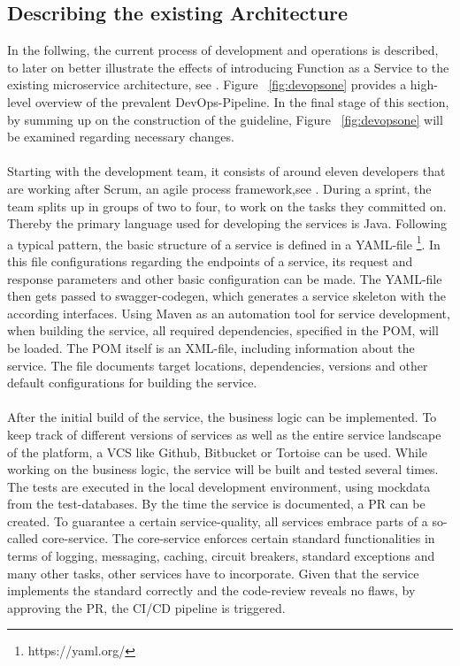\documentclass[a4paper,11pt, pagesize]{scrartcl}
\begin{document}
\begin{spacing}{1.2}
\subsection{Describing the existing Architecture}
In the follwing, the current process of development and operations is described, to later on better illustrate the effects of introducing Function as a Service to the existing microservice architecture, see \cite{newman2015building}. Figure ~\ref{fig:devopsone} provides a high-level overview of the prevalent DevOps-Pipeline. In the final stage of this section, by summing up on the construction of the guideline, Figure ~\ref{fig:devopsone} will be examined regarding necessary changes.\\\\ Starting with the development team, it consists of around eleven developers that are working after Scrum, an agile process framework,see \cite{pichler2013scrum}. During a sprint, the team splits up in groups of two to four, to work on the tasks they committed on. Thereby the primary language used for developing the services is Java. Following a typical pattern, the basic structure of a service is defined in a YAML-file \footnote{https://yaml.org/}. In this file configurations regarding the endpoints of a service, its request and response parameters and other basic configuration can be made. The YAML-file then gets passed to swagger-codegen, which generates a service skeleton with the according interfaces. Using Maven as an automation tool for service development, when building the service, all required dependencies, specified in the POM, will be loaded. The POM itself is an XML-file, including information about the service. The file documents target locations, dependencies, versions and other default configurations for building the service. \\\\After the initial build of the service, the business logic can be implemented. To keep track of different versions of services as well as the entire service landscape of the platform, a VCS like Github, Bitbucket or Tortoise can be used. While working on the business logic, the service will be built and tested several times. The tests are executed in the local development environment, using mockdata from the test-databases. By the time the service is documented, a PR can be created. To guarantee a certain service-quality, all services embrace parts of a so-called core-service. The core-service enforces certain standard functionalities in terms of logging, messaging, caching, circuit breakers, standard exceptions and many other tasks, other services have to incorporate. Given that the service implements the standard correctly and the code-review reveals no flaws, by approving the PR, the CI/CD pipeline is triggered.    

\end{spacing}
\end{document}
